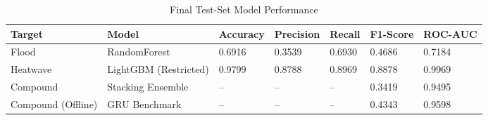 \begin{table}[t]
\centering
\caption{Final Test-Set Model Performance}
\label{tab:performance}
\begin{tabular}{@{}lllllll@{}}
\toprule
\textbf{Target} & \textbf{Model} & \textbf{Accuracy} & \textbf{Precision} & \textbf{Recall} & \textbf{F1-Score} & \textbf{ROC-AUC} \\
\midrule
Flood & RandomForest & 0.6916 & 0.3539 & 0.6930 & 0.4686 & 0.7184 \\
Heatwave & LightGBM (Restricted) & 0.9799 & 0.8788 & 0.8969 & 0.8878 & 0.9969 \\
Compound & Stacking Ensemble & -- & -- & -- & 0.3419 & 0.9495 \\
Compound (Offline) & GRU Benchmark & -- & -- & -- & 0.4343 & 0.9598 \\
\bottomrule
\end{tabular}
\end{table}